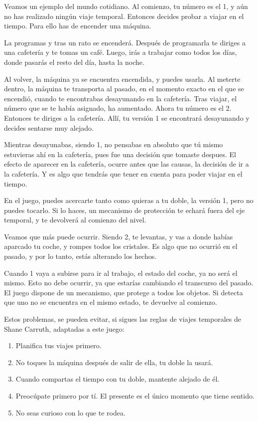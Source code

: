 \documentclass[11pt,a4paper]{article}
\begin{document}
Veamos un ejemplo del mundo cotidiano. Al comienzo, tu número es el 1, y aún no 
has realizado ningún viaje temporal. Entonces decides probar a viajar en el 
tiempo. Para ello has de encender una máquina.

La programas y tras un rato se encenderá. Después de programarla te diriges a 
una cafetería y te tomas un café. Luego, irás a trabajar como todos los días, 
donde pasarás el resto del día, hasta la noche.

Al volver, la máquina ya se encuentra encendida, y puedes usarla. Al meterte 
dentro, la máquina te transporta al pasado, en el momento exacto en el que se 
encendió, cuando te encontrabas desayunando en la cafetería. Tras viajar, el 
número que se te había asignado, ha aumentado. Ahora tu número es el 2.  
Entonces te diriges a la cafetería. Allí, tu versión 1 se encontrará desayunando 
y decides sentarse muy alejado.

Mientras desayunabas, siendo 1, no pensabas en absoluto que tú mismo estuvieras 
ahí en la cafetería, pues fue una decisión que tomaste despues. El efecto de 
aparecer en la cafetería, ocurre antes que las causas, la decisión de ir a la 
cafetería. Y es algo que tendrás que tener en cuenta para poder viajar en el 
tiempo.

En el juego, puedes acercarte tanto como quieras a tu doble, la versión 1, pero 
no puedes tocarlo. Si lo haces, un mecanismo de protección te echará fuera del 
eje temporal, y te devolverá al comienzo del nivel.

Veamos que más puede ocurrir. Siendo 2, te levantas, y vas a donde habías 
aparcado tu coche, y rompes todos los cristales. Es algo que no ocurrió en el 
pasado, y por lo tanto, estás alterando los hechos.

Cuando 1 vaya a subirse para ir al trabajo, el estado del coche, ya no será el 
mismo. Esto no debe ocurrir, ya que estarías cambiando el transcurso del pasado.  
El juego dispone de un mecanismo, que protege a todos los objetos. Si detecta 
que uno no se encuentra en el mismo estado, te devuelve al comienzo.

Estos problemas, se pueden evitar, si sigues las reglas de viajes temporales de 
Shane Carruth, adaptadas a este juego:

\begin{enumerate}
\item Planifica tus viajes primero.
\item No toques la máquina después de salir de ella, tu doble la usará.
\item Cuando compartas el tiempo con tu doble, mantente alejado de él.
\item Preocúpate primero por tí. El presente es el único momento que tiene 
sentido.
\item No seas curioso con lo que te rodea.
\end{enumerate}
\end{document}
